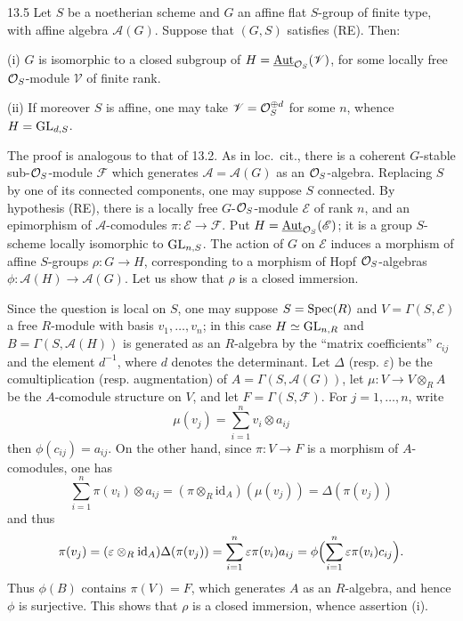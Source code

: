 \begin{proposition}{13.5}\label{VIB.13.5}
Let $S$ be a noetherian scheme and $G$ an affine flat $S$-group of finite type, with affine algebra $\mathscr A(G)$. Suppose that $(G,S)$ satisfies (RE). Then:

(i) $G$ is isomorphic to a closed subgroup of $H=\underline{\operatorname{Aut}}_{\mathcal{O}_S}(\mathscr V)$, for some locally free $\mathcal{O}_S$-module $\mathscr V$ of finite rank.

(ii) If moreover $S$ is affine, one may take $\mathscr V=\mathcal{O}_S^{\oplus d}$ for some $n$, whence $H=\operatorname{GL}_{d,S}$.
\end{proposition}
The proof is analogous to that of 13.2. As in loc.\ cit., there is a coherent $G$-stable sub-$\mathcal{O}_S$-module $\mathscr F$ which generates $\mathscr A=\mathscr A(G)$ as an $\mathcal{O}_S$-algebra. Replacing $S$ by one of its connected components, one may suppose $S$ connected. By hypothesis (RE), there is a locally free $G$-$\mathcal{O}_S$-module $\mathscr E$ of rank $n$, and an epimorphism of $\mathscr A$-comodules $\pi:\mathscr E\to\mathscr F$. Put $H=\underline{\operatorname{Aut}}_{\mathcal{O}_S}(\mathscr E)$; it is a group $S$-scheme locally isomorphic to $\operatorname{GL}_{n,S}$. The action of $G$ on $\mathscr E$ induces a morphism of affine $S$-groups $\rho:G\to H$, corresponding to a morphism of Hopf $\mathcal{O}_S$-algebras $\phi:\mathscr A(H)\to\mathscr A(G)$. Let us show that $\rho$ is a closed immersion.

Since the question is local on $S$, one may suppose $S=\operatorname{Spec}(R)$ and $V=\Gamma(S,\mathscr E)$ a free $R$-module with basis $v_1,\ldots,v_n$; in this case $H\simeq\operatorname{GL}_{n,R}$ and $B=\Gamma(S,\mathscr A(H))$ is generated as an $R$-algebra by the ``matrix coefficients'' $c_{ij}$ and the element $d^{-1}$, where $d$ denotes the determinant. Let $\Delta$ (resp. $\varepsilon$) be the comultiplication (resp. augmentation) of $A=\Gamma(S,\mathscr A(G))$, let $\mu:V\to V\otimes_R A$ be the $A$-comodule structure on $V$, and let $F=\Gamma(S,\mathscr F)$. For $j=1,\ldots,n$, write
\[
\mu(v_j)=\sum_{i=1}^n v_i\otimes a_{ij}
\]
then $\phi(c_{ij})=a_{ij}$. On the other hand, since $\pi:V\to F$ is a morphism of $A$-comodules, one has
\[
\sum_{i=1}^n\pi(v_i)\otimes a_{ij}=(\pi\otimes_R\mathrm{id}_A)(\mu(v_j))=\Delta(\pi(v_j))
\]
and thus
\[
\pi(v_j)=(\varepsilon\otimes_R\mathrm{id}_A)\Delta(\pi(v_j))=\sum_{i=1}^n\varepsilon\pi(v_i)a_{ij}=\phi\Bigl(\sum_{i=1}^n\varepsilon\pi(v_i)c_{ij}\Bigr).
\]
Thus $\phi(B)$ contains $\pi(V)=F$, which generates $A$ as an $R$-algebra, and hence $\phi$ is surjective. This shows that $\rho$ is a closed immersion, whence assertion (i).

